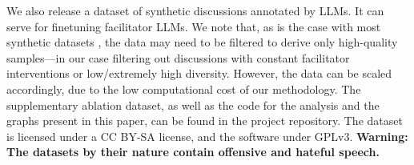 %

We also release \vmd\datasetlink a dataset of synthetic discussions annotated by LLMs. It can serve for finetuning facilitator LLMs. We note that, as is the case with most synthetic datasets \citep{ulmer2024}, the data may need to be filtered to derive only high-quality samples---in our case filtering out discussions with constant facilitator interventions or low/extremely high diversity. However, the data can be scaled accordingly, due to the low computational cost of our methodology. The supplementary ablation dataset, as well as the code for the analysis and the graphs present in this paper, can be found in the project repository\analysislink. The dataset is licensed under a CC BY-SA license, and the software under GPLv3. \textbf{Warning: The datasets by their nature contain offensive and hateful speech.}